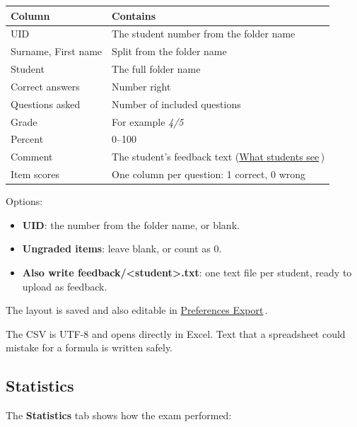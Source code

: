 \begingroup\renewcommand{\arraystretch}{1.35}
\noindent\begin{tabularx}{\linewidth}{YY}
\toprule
\textbf{Column} & \textbf{Contains} \\
\midrule
UID & The student number from the folder name \\
Surname, First name & Split from the folder name \\
Student & The full folder name \\
Correct answers & Number right \\
Questions asked & Number of included questions \\
Grade & For example \emph{4/5} \\
Percent & 0--100 \\
Comment & The student's feedback text (\href{https://github.com/agadin/micro-speed-grader/blob/main/docs/help/feedback.md}{What students see}\,\onlinemark{}) \\
Item scores & One column per question: 1 correct, 0 wrong \\
\bottomrule
\end{tabularx}\endgroup\par\medskip

Options:

\begin{itemize}[topsep=2pt, itemsep=2pt]
\item \textbf{UID}: the number from the folder name, or blank.
\item \textbf{Ungraded items}: leave blank, or count as 0.
\item \textbf{Also write feedback/\textless{}student\textgreater{}.txt}: one text file per student, ready to upload as feedback.
\end{itemize}

The layout is saved and also editable in \href{https://github.com/agadin/micro-speed-grader/blob/main/docs/help/preferences.md\#export}{Preferences \menuarrow{} Export}\,\onlinemark{}.

The CSV is UTF-8 and opens directly in Excel. Text that a spreadsheet could mistake for a formula is written safely.

\subsection{Statistics}\label{sec:export:statistics}


The \textbf{Statistics} tab shows how the exam performed:

